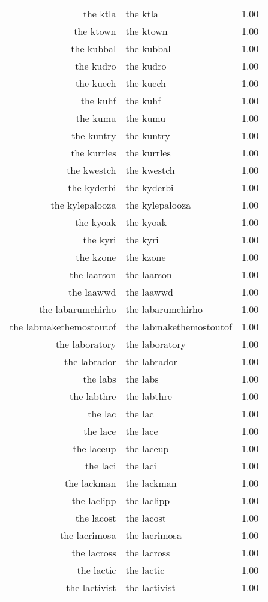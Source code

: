 \begin{table}[ht]
\begin{tabular}{rlr}
  the ktla & the ktla & 1.00 \\ 
  the ktown & the ktown & 1.00 \\ 
  the kubbal & the kubbal & 1.00 \\ 
  the kudro & the kudro & 1.00 \\ 
  the kuech & the kuech & 1.00 \\ 
  the kuhf & the kuhf & 1.00 \\ 
  the kumu & the kumu & 1.00 \\ 
  the kuntry & the kuntry & 1.00 \\ 
  the kurrles & the kurrles & 1.00 \\ 
  the kwestch & the kwestch & 1.00 \\ 
  the kyderbi & the kyderbi & 1.00 \\ 
  the kylepalooza & the kylepalooza & 1.00 \\ 
  the kyoak & the kyoak & 1.00 \\ 
  the kyri & the kyri & 1.00 \\ 
  the kzone & the kzone & 1.00 \\ 
  the laarson & the laarson & 1.00 \\ 
  the laawwd & the laawwd & 1.00 \\ 
  the labarumchirho & the labarumchirho & 1.00 \\ 
  the labmakethemostoutof & the labmakethemostoutof & 1.00 \\ 
  the laboratory & the laboratory & 1.00 \\ 
  the labrador & the labrador & 1.00 \\ 
  the labs & the labs & 1.00 \\ 
  the labthre & the labthre & 1.00 \\ 
  the lac & the lac & 1.00 \\ 
  the lace & the lace & 1.00 \\ 
  the laceup & the laceup & 1.00 \\ 
  the laci & the laci & 1.00 \\ 
  the lackman & the lackman & 1.00 \\ 
  the laclipp & the laclipp & 1.00 \\ 
  the lacost & the lacost & 1.00 \\ 
  the lacrimosa & the lacrimosa & 1.00 \\ 
  the lacross & the lacross & 1.00 \\ 
  the lactic & the lactic & 1.00 \\ 
  the lactivist & the lactivist & 1.00 \\ 

\end{tabular}
\end{table}
